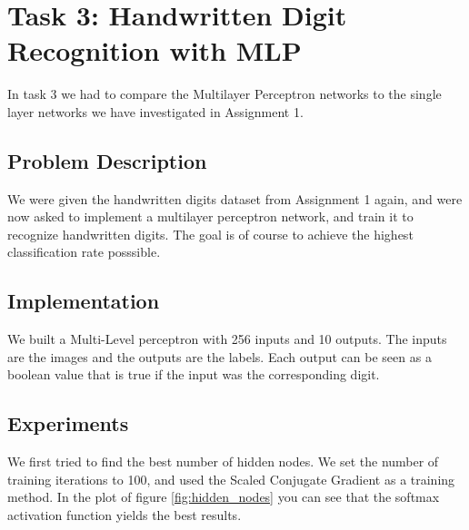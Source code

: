 \documentclass{article}
\begin{document}
\newpage
\section{Task 3: Handwritten Digit Recognition with MLP}
In task 3 we had to compare the Multilayer Perceptron networks to the single layer networks we have investigated in Assignment 1.

\subsection{Problem Description}
We were given the handwritten digits dataset from Assignment 1 again, and were now asked to implement a multilayer perceptron network, and train it to recognize handwritten digits.
The goal is of course to achieve the highest classification rate posssible.

\subsection{Implementation}
We built a Multi-Level perceptron with 256 inputs and 10 outputs. The inputs are the images and the outputs are the labels. Each output can be seen as a boolean value that is true if the input was the corresponding digit. 


\subsection{Experiments}
We first tried to find the best number of hidden nodes. We set the number of training iterations to 100, and used the Scaled Conjugate Gradient as a training method. In the plot of figure \ref{fig:hidden_nodes} you can see that the softmax activation function yields the best results.
\end{document}
